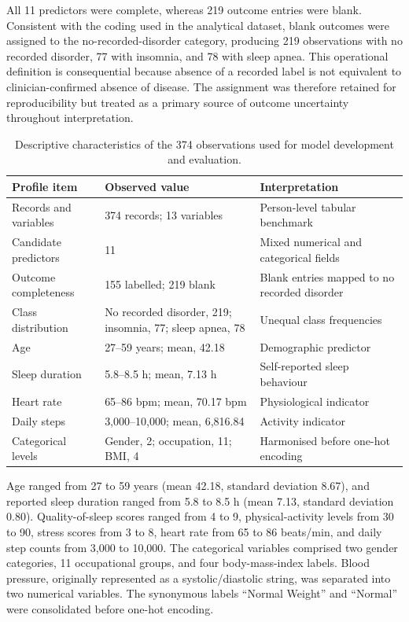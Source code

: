 \documentclass{elektr}
\begin{document}
All 11 predictors were complete, whereas 219 outcome entries were blank. Consistent with the coding used in the analytical dataset, blank outcomes were assigned to the no-recorded-disorder category, producing 219 observations with no recorded disorder, 77 with insomnia, and 78 with sleep apnea. This operational definition is consequential because absence of a recorded label is not equivalent to clinician-confirmed absence of disease. The assignment was therefore retained for reproducibility but treated as a primary source of outcome uncertainty throughout interpretation.

\begin{table}[ht]
\centering
\caption{Descriptive characteristics of the 374 observations used for model development and evaluation.}
\label{tab:datasetprofile}
\small
\setlength{\tabcolsep}{5pt}
\renewcommand{\arraystretch}{1.05}
\begin{tabularx}{\textwidth}{@{}L{0.25\textwidth}L{0.27\textwidth}Y@{}}
\toprule
Profile item & Observed value & Interpretation \\
\midrule
Records and variables & 374 records; 13 variables & Person-level tabular benchmark \\
Candidate predictors & 11 & Mixed numerical and categorical fields \\
Outcome completeness & 155 labelled; 219 blank & Blank entries mapped to no recorded disorder \\
Class distribution & No recorded disorder, 219; insomnia, 77; sleep apnea, 78 & Unequal class frequencies \\
Age & 27--59 years; mean, 42.18 & Demographic predictor \\
Sleep duration & 5.8--8.5 h; mean, 7.13 h & Self-reported sleep behaviour \\
Heart rate & 65--86 bpm; mean, 70.17 bpm & Physiological indicator \\
Daily steps & 3,000--10,000; mean, 6,816.84 & Activity indicator \\
Categorical levels & Gender, 2; occupation, 11; BMI, 4 & Harmonised before one-hot encoding \\
\bottomrule
\end{tabularx}
\end{table}

Age ranged from 27 to 59 years (mean 42.18, standard deviation 8.67), and reported sleep duration ranged from 5.8 to 8.5 h (mean 7.13, standard deviation 0.80). Quality-of-sleep scores ranged from 4 to 9, physical-activity levels from 30 to 90, stress scores from 3 to 8, heart rate from 65 to 86 beats/min, and daily step counts from 3,000 to 10,000. The categorical variables comprised two gender categories, 11 occupational groups, and four body-mass-index labels. Blood pressure, originally represented as a systolic/diastolic string, was separated into two numerical variables. The synonymous labels ``Normal Weight'' and ``Normal'' were consolidated before one-hot encoding.
\end{document}

